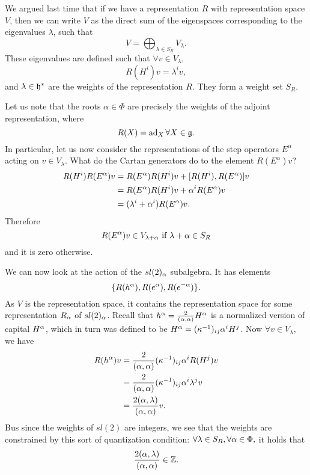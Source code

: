 We argued last time that if we have a representation $R$ with representation space $V$, then we can write $V$ as the direct sum of the eigenspaces corresponding to the eigenvalues $\lambda$, such that
$$V=\bigoplus_{\lambda\in S_R} V_\lambda.$$
These eigenvalues are defined such that $\forall v\in V_{\lambda},$
$$R(H^i)v = \lambda^i v,$$
and $\lambda\in \mathfrak{h}^*$ are the weights of the representation $R$. They form a weight set $S_R.$

Let us note that the roots $\alpha \in \Phi$ are precisely the weights of the adjoint representation, where
$$R(X)=\operatorname{ad}_X \forall X\in \mathfrak{g}.$$
In particular, let us now consider the representations of the step operators $E^\alpha$ acting on $v\in V_\lambda.$ What do the Cartan generators do to the element $R(E^\alpha)v$?
\begin{align*}
    R(H^i)R(E^\alpha)v&= R(E^\alpha)R(H^i)v+[R(H^i),R(E^\alpha)]v\\
    &=R(E^\alpha)R(H^i)v+\alpha^i R(E^\alpha)v\\
    &=(\lambda^i+\alpha^i)R(E^\alpha)v.
\end{align*}
Therefore
$$R(E^\alpha)v\in V_{\lambda+\alpha}\text{ if }\lambda+\alpha \in S_R$$
and it is zero otherwise.

We can now look at the action of the $sl(2)_\alpha$ subalgebra. It has elements
$$\{R(h^\alpha),R(e^\alpha),R(e^{-\alpha})\}.$$
As $V$ is the representation space, it contains the representation space for some representation $R_\alpha$ of $sl(2)_\alpha$. Recall that $h^\alpha=\frac{2}{(\alpha,\alpha)}H^\alpha$ is a normalized version of capital $H^\alpha$, which in turn was defined to be $H^\alpha=(\kappa^{-1})_{ij}\alpha^i H^j$. Now $\forall v\in V_\lambda,$ we have
\begin{align*}
    R(h^\alpha)v&= \frac{2}{(\alpha,\alpha)}(\kappa^{-1})_{ij}\alpha^i R(H^j)v\\
    &=\frac{2}{(\alpha,\alpha)}(\kappa^{-1})_{ij}\alpha^i \lambda^j v\\
    &=\frac{2(\alpha,\lambda)}{(\alpha,\alpha)}v.
\end{align*}
Bus since the weights of $sl(2)$ are integers, we see that the weights are constrained by this sort of quantization condition: $\forall \lambda\in S_R,\forall \alpha\in \Phi,$ it holds that
$$\frac{2(\alpha,\lambda)}{(\alpha,\alpha)}\in \mathbb{Z}.$$

